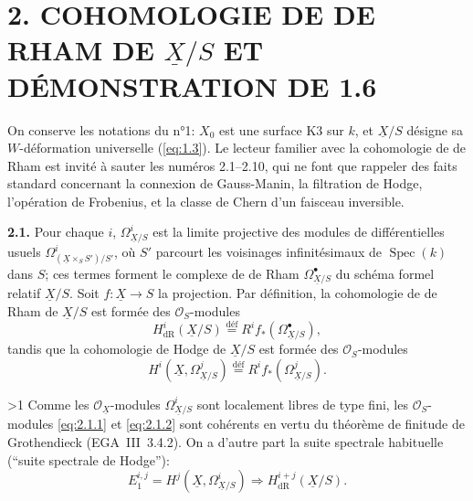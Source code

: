 \documentclass[10pt]{article}
\makeatletter
\DeclareMathOperator{\Spec}{Spec}
\newcommand{\UX}{\underline{X}}
\newcommand{\sourceanchor}[2]{\begingroup\def\@currentlabel{#2}\label{#1}\endgroup}
\newcommand{\DPage}[2]{\ifnum#1>1\clearpage\fi\setcounter{page}{#2}}
\makeatother
\begin{document}
\section*{2. COHOMOLOGIE DE DE RHAM DE $\UX/S$ ET DÉMONSTRATION DE 1.6}\sourceanchor{sec:2}{2}

On conserve les notations du n°1: $X_0$ est une surface K3 sur $k$, et $\UX/S$ désigne sa $W$-déformation universelle (\eqref{eq:1.3}). Le lecteur familier avec la cohomologie de de Rham est invité à sauter les numéros 2.1--2.10, qui ne font que rappeler des faits standard concernant la connexion de Gauss-Manin, la filtration de Hodge, l'opération de Frobenius, et la classe de Chern d'un faisceau inversible.

\noindent\textbf{2.1.}
Pour chaque $i$, $\Omega^i_{\UX/S}$ est la limite projective des modules de différentielles usuels $\Omega^i_{(\UX\times_S S')/S'}$, où $S'$ parcourt les voisinages infinitésimaux de $\Spec(k)$ dans $S$; ces termes forment le complexe de de Rham $\Omega^\bullet_{\UX/S}$ du schéma formel relatif $\UX/S$. Soit $f: \UX \to S$ la projection. Par définition, la cohomologie de de Rham de $\UX/S$ est formée des $\mathcal{O}_S$-modules
\begin{equation}\tag{2.1.1}\label{eq:2.1.1}
H^i_{\mathrm{dR}}(\UX/S) \overset{\text{déf}}{=} R^i f_*(\Omega_{\UX/S}^{\bullet}),
\end{equation}
tandis que la cohomologie de Hodge de $\UX/S$ est formée des $\mathcal{O}_S$-modules
\begin{equation}\tag{2.1.2}\label{eq:2.1.2}
H^i(\UX, \Omega_{\UX/S}^j) \overset{\text{déf}}{=} R^i f_*(\Omega_{\UX/S}^j).
\end{equation}

\DPage{8}{65}
Comme les $\mathcal{O}_{\UX}$-modules $\Omega_{\UX/S}^i$ sont localement libres de type fini, les $\mathcal{O}_S$-modules \eqref{eq:2.1.1} et \eqref{eq:2.1.2} sont cohérents en vertu du théorème de finitude de Grothendieck (EGA~III~3.4.2). On a d'autre part la suite spectrale habituelle (``suite spectrale de Hodge''):
\begin{equation}\tag{2.1.3}\label{eq:2.1.3}
E_1^{i,j} = H^j(\UX, \Omega_{\UX/S}^i) \Rightarrow H^{i+j}_{\mathrm{dR}}(\UX/S).
\end{equation}
\end{document}
